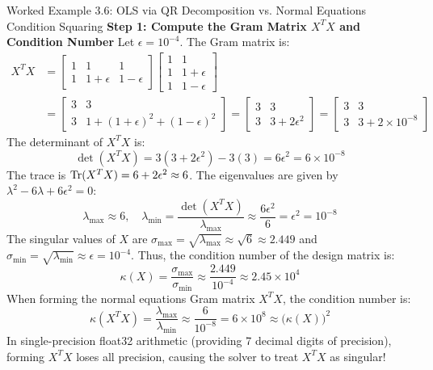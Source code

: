 \begin{examplebox}{Worked Example 3.6: OLS via QR Decomposition vs. Normal Equations Condition Squaring}
\textbf{Step 1: Compute the Gram Matrix $X^T X$ and Condition Number}
Let $\epsilon = 10^{-4}$. The Gram matrix is:
\begin{align*}
X^T X &= \begin{bmatrix} 1 & 1 & 1 \\ 1 & 1+\epsilon & 1-\epsilon \end{bmatrix} \begin{bmatrix} 1 & 1 \\ 1 & 1+\epsilon \\ 1 & 1-\epsilon \end{bmatrix} \\
&= \begin{bmatrix} 3 & 3 \\ 3 & 1 + (1+\epsilon)^2 + (1-\epsilon)^2 \end{bmatrix} = \begin{bmatrix} 3 & 3 \\ 3 & 3 + 2\epsilon^2 \end{bmatrix} = \begin{bmatrix} 3 & 3 \\ 3 & 3 + 2 \times 10^{-8} \end{bmatrix}
\end{align*}
The determinant of $X^T X$ is:
\begin{equation*}
\det(X^T X) = 3(3 + 2\epsilon^2) - 3(3) = 6\epsilon^2 = 6 \times 10^{-8}
\end{equation*}
The trace is $\operatorname{Tr}(X^T X) = 6 + 2\epsilon^2 \approx 6$.
The eigenvalues are given by $\lambda^2 - 6\lambda + 6\epsilon^2 = 0$:
\begin{equation*}
\lambda_{\max} \approx 6, \quad \lambda_{\min} = \frac{\det(X^T X)}{\lambda_{\max}} \approx \frac{6\epsilon^2}{6} = \epsilon^2 = 10^{-8}
\end{equation*}
The singular values of $X$ are $\sigma_{\max} = \sqrt{\lambda_{\max}} \approx \sqrt{6} \approx 2.449$ and $\sigma_{\min} = \sqrt{\lambda_{\min}} \approx \epsilon = 10^{-4}$.
Thus, the condition number of the design matrix is:
\begin{equation*}
\kappa(X) = \frac{\sigma_{\max}}{\sigma_{\min}} \approx \frac{2.449}{10^{-4}} \approx 2.45 \times 10^4
\end{equation*}
When forming the normal equations Gram matrix $X^T X$, the condition number is:
\begin{equation*}
\kappa(X^T X) = \frac{\lambda_{\max}}{\lambda_{\min}} \approx \frac{6}{10^{-8}} = 6 \times 10^8 \approx \big( \kappa(X) \big)^2
\end{equation*}
In single-precision float32 arithmetic (providing 7 decimal digits of precision), forming $X^T X$ loses all precision, causing the solver to treat $X^T X$ as singular!


\end{examplebox}
